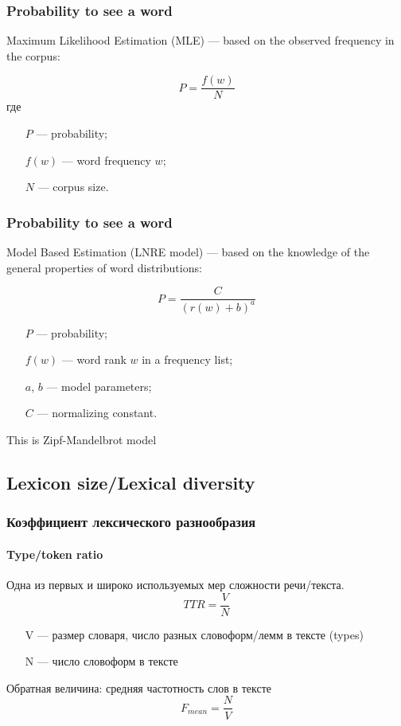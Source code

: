 \documentclass[svgnames]{beamer}
\begin{document}
\begin{frame}
  \frametitle{Probability to see a word}

  Maximum Likelihood Estimation (MLE) — based on the observed
  frequency in the corpus:

  $$
  P = \frac{f(w)}{N}
  $$
  где 
  \begin{itemize}
  \item[$P$] — probability;
  \item[$f(w)$] — word frequency $w$;
  \item[$N$] — corpus size.
  \end{itemize}
\end{frame}

\begin{frame}
  \frametitle{Probability to see a word}

  Model Based Estimation (LNRE model) — based on the knowledge of the
  general properties of word distributions:

  $$
  P = \frac{C}{(r(w) + b)^a}
  $$
  \begin{itemize}
  \item[$P$] — probability;
  \item[$f(w)$] — word rank $w$ in a frequency list;
  \item[$a$, $b$] — model parameters;
  \item[$C$] — normalizing constant.
  \end{itemize}

  This is Zipf-Mandelbrot model
\end{frame}

\subsection{Lexicon size/Lexical diversity}

\begin{frame}
  \frametitle{Коэффициент лексического разнообразия}
  \framesubtitle{Type/token ratio}
  Одна из первых и широко используемых мер сложности речи/текста.
  \begin{equation}
    TTR = \frac{V}{N}
  \end{equation}
  \begin{itemize}
  \item[V] — размер словаря, число разных словоформ/лемм в тексте (types)
  \item[N] — число словоформ в тексте
  \end{itemize}
  \pause
  Обратная величина: средняя частотность слов в тексте
  \begin{equation}
    F_{mean} = \frac{N}{V}
  \end{equation}
\end{frame}
\end{document}
